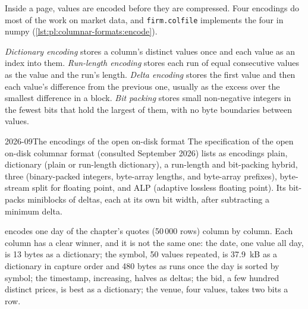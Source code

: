 Inside a page, values are encoded before they are compressed. Four encodings do most of the work on market data, and
\texttt{firm.colfile} implements the four in numpy (\cref{lst:pl:columnar-formats:encode}).

\begin{definition}\label{def:pl:columnar-formats:encodings}
\emph{Dictionary encoding} stores a column's distinct values once and each value as an index into
them. \emph{Run-length encoding} stores each run of equal consecutive values as the value and the run's
length. \emph{Delta encoding} stores the first value and then each value's difference from the previous
one, usually as the excess over the smallest difference in a block. \emph{Bit packing} stores small
non-negative integers in the fewest bits that hold the largest of them, with no byte boundaries between values.
\end{definition}

\label{lst:pl:columnar-formats:encode}

\begin{dated}{2026-09}{The encodings of the open on-disk format}\label{dat:pl:columnar-formats:encodings}
The specification of the open on-disk columnar format (consulted September 2026) lists as encodings plain, dictionary (plain or
run-length dictionary), a run-length and bit-packing hybrid, three  (binary-packed integers, byte-array lengths,
and byte-array prefixes), byte-stream split for floating point, and ALP (adaptive lossless floating point). Its 
bit-packs miniblocks of deltas, each at its own bit width, after subtracting a minimum delta.
\end{dated}

 encodes one day of the chapter's quotes (50\,000 rows) column by column. Each column
has a clear winner, and it is not the same one: the date, one value all day, is 13 bytes as a dictionary; the symbol, 50 values
repeated, is 37.9~kB as a dictionary in capture order and 480 bytes as runs once the day is sorted by symbol; the timestamp,
increasing, halves as deltas; the bid, a few hundred distinct prices, is best as a dictionary; the venue, four values, takes two
bits a row.

